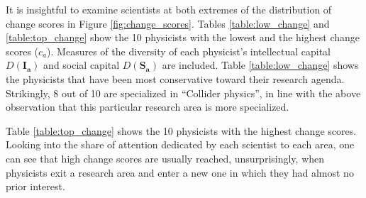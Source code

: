 \documentclass{article}
\begin{document}
It is insightful to examine scientists at both extremes of the distribution of change scores in Figure \ref{fig:change_scores}. Tables \ref{table:low_change} and \ref{table:top_change} show the 10 physicists with the lowest and the highest change scores ($c_a$). Measures of the diversity of each physicist's intellectual capital $D(\bm{I_a})$ and social capital $D(\bm{S_a})$ are included. Table \ref{table:low_change} shows the physicists that have been most conservative toward their research agenda. Strikingly, 8 out of 10 are specialized in ``Collider physics'', in line with the above observation that this particular research area is more specialized.

Table \ref{table:top_change} shows the 10 physicists with the highest change scores.  Looking into the share of attention dedicated by each scientist to each area, one can see that high change scores are usually reached, unsurprisingly, when physicists exit a research area and enter a new one in which they had almost no prior interest. %
\end{document}
